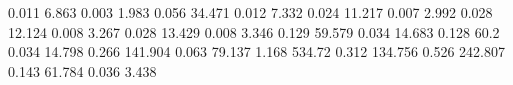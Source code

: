 0.011      6.863      %
0.003      1.983      %
0.056      34.471     %
0.012      7.332      %
0.024      11.217     %
0.007      2.992      %
0.028      12.124     %
0.008      3.267      %
0.028      13.429     %
0.008      3.346      %
0.129      59.579     %
0.034      14.683     %
0.128      60.2       %
0.034      14.798     %
0.266      141.904    %
0.063      79.137     %
1.168      534.72     %
0.312      134.756    %
0.526      242.807    %
0.143      61.784     %
0.036      3.438      %
